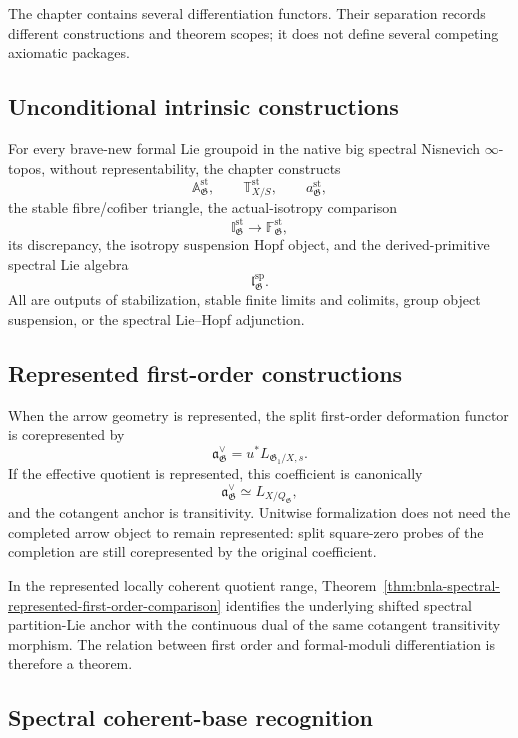 The chapter contains several differentiation functors.  Their separation
records different constructions and theorem scopes; it does not define
several competing axiomatic packages.

\subsection{Unconditional intrinsic constructions}

For every brave-new formal Lie groupoid in the native big spectral Nisnevich
$\infty$-topos, without representability, the chapter constructs
\[
    \mathbb A^{\mathrm{st}}_{\mathfrak G},
    \qquad
    \mathbb T^{\mathrm{st}}_{X/S},
    \qquad
    a^{\mathrm{st}}_{\mathfrak G},
\]
the stable fibre/cofiber triangle, the actual-isotropy comparison
\[
    \mathbb I^{\mathrm{st}}_{\mathfrak G}
    \longrightarrow
    \mathbb F^{\mathrm{st}}_{\mathfrak G},
\]
its discrepancy, the isotropy suspension Hopf object, and the derived-primitive
spectral Lie algebra
\[
    \mathfrak l^{\mathrm{sp}}_{\mathfrak G}.
\]
All are outputs of stabilization, stable finite limits and colimits, group
object suspension, or the spectral Lie--Hopf adjunction.

\subsection{Represented first-order constructions}

When the arrow geometry is represented, the split first-order deformation
functor is corepresented by
\[
    \mathfrak a^\vee_{\mathfrak G}
    =u^*L_{\mathfrak G_1/X,s}.
\]
If the effective quotient is represented, this coefficient is canonically
\[
    \mathfrak a^\vee_{\mathfrak G}
    \simeq L_{X/Q_{\mathfrak G}},
\]
and the cotangent anchor is transitivity.  Unitwise formalization does not
need the completed arrow object to remain represented: split square-zero
probes of the completion are still corepresented by the original coefficient.

In the represented locally coherent quotient range,
Theorem~\ref{thm:bnla-spectral-represented-first-order-comparison} identifies
the underlying shifted spectral partition-Lie anchor with the continuous dual
of the same cotangent transitivity morphism.  The relation between first order
and formal-moduli differentiation is therefore a theorem.

\subsection{Spectral coherent-base recognition}

